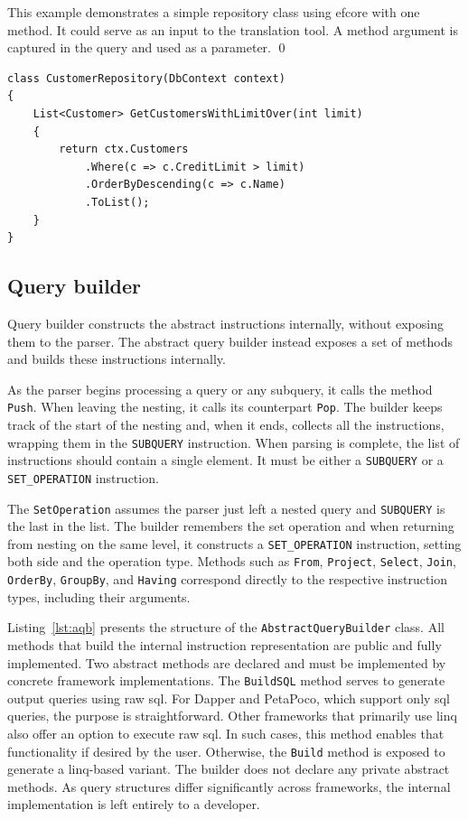 \begin{example}
\small
This example demonstrates a simple repository class using \acrshort{efcore} with one method. 
It could serve as an input to the translation tool. A method argument is captured in the query and used as a parameter.
\qed
\begin{lstlisting}[language=CSharp]
class CustomerRepository(DbContext context)
{
    List<Customer> GetCustomersWithLimitOver(int limit)
    {
        return ctx.Customers
            .Where(c => c.CreditLimit > limit)
            .OrderByDescending(c => c.Name)
            .ToList();
    }
}
\end{lstlisting}
\end{example}

\subsection{Query builder}

Query builder constructs the abstract instructions internally, without exposing them to the parser. The abstract query builder instead exposes a set of methods and builds these instructions internally.

As the parser begins processing a query or any subquery, it calls the method \texttt{Push}. When leaving the nesting, it calls its counterpart \texttt{Pop}. The builder keeps track of the start of the nesting and, when it ends, collects all the instructions, wrapping them in the \texttt{SUBQUERY} instruction. When parsing is complete, the list of instructions should contain a single element. It must be either a \texttt{SUBQUERY} or a \texttt{SET\_OPERATION} instruction.

The \texttt{SetOperation} assumes the parser just left a nested query and \texttt{SUBQUERY} is the last in the list. The builder remembers the set operation and when returning from nesting on the same level, it constructs a \texttt{SET\_OPERATION} instruction, setting both side and the operation type.
Methods such as \texttt{From}, \texttt{Project}, \texttt{Select}, \texttt{Join}, \texttt{OrderBy}, \texttt{GroupBy}, and \texttt{Having} correspond directly to the respective instruction types, including their arguments. 

Listing~\ref{lst:aqb} presents the structure of the \texttt{AbstractQueryBuilder} class. All methods that build the internal instruction representation are public and fully implemented. Two abstract methods are declared and must be implemented by concrete framework implementations. The \texttt{BuildSQL} method serves to generate output queries using raw \acrshort{sql}. For Dapper and PetaPoco, which support only \acrshort{sql} queries, the purpose is straightforward. Other frameworks that primarily use \acrshort{linq} also offer an option to execute raw \acrshort{sql}. In such cases, this method enables that functionality if desired by the user. Otherwise, the \texttt{Build} method is exposed to generate a \acrshort{linq}-based variant. The builder does not declare any private abstract methods. As query structures differ significantly across frameworks, the internal implementation is left entirely to a developer.

